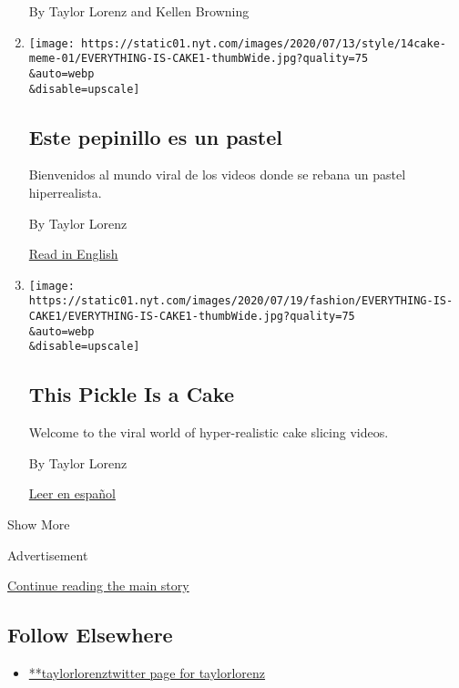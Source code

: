 \begin{enumerate}
  By Taylor Lorenz and Kellen Browning
\item
  \href{/es/2020/07/14/espanol/estilos-de-vida/pastel-realista-meme.html}{}

  \texttt{[image: https://static01.nyt.com/images/2020/07/13/style/14cake-meme-01/EVERYTHING-IS-CAKE1-thumbWide.jpg?quality=75\\\&auto=webp\\\&disable=upscale]}

  \hypertarget{este-pepinillo-es-un-pastel}{%
  \subsection{Este pepinillo es un
  pastel}\label{este-pepinillo-es-un-pastel}}

  Bienvenidos al mundo viral de los videos donde se rebana un pastel
  hiperrealista.

  By Taylor Lorenz

  \href{https://www.nytimes.com/2020/07/14/style/what-is-the-cake-meme.html}{Read
  in English}
\item
  \href{/2020/07/14/style/what-is-the-cake-meme.html}{}

  \texttt{[image: https://static01.nyt.com/images/2020/07/19/fashion/EVERYTHING-IS-CAKE1/EVERYTHING-IS-CAKE1-thumbWide.jpg?quality=75\\\&auto=webp\\\&disable=upscale]}

  \hypertarget{this-pickle-is-a-cake}{%
  \subsection{This Pickle Is a Cake}\label{this-pickle-is-a-cake}}

  Welcome to the viral world of hyper-realistic cake slicing videos.

  By Taylor Lorenz

  \href{https://www.nytimes.com/es/2020/07/14/espanol/estilos-de-vida/pastel-realista-meme.html}{Leer
  en español}
\end{enumerate}

Show More

Advertisement

\protect\hyperlink{after-mid2}{Continue reading the main story}

\hypertarget{follow-elsewhere}{%
\subsection{Follow Elsewhere}\label{follow-elsewhere}}

\begin{itemize}
\tightlist
\item
  \href{https://twitter.com/taylorlorenz}{**taylorlorenztwitter page for
  taylorlorenz}
\end{itemize}


